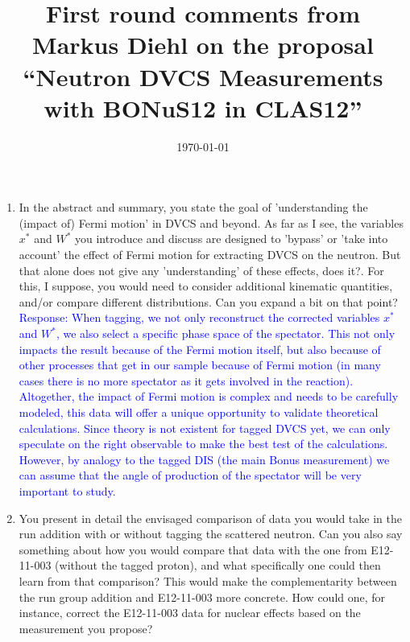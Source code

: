 \documentclass[a4paper,11pt,twoside]{article}
\title{First round comments from Markus Diehl on the proposal ``Neutron DVCS 
Measurements with BONuS12 in CLAS12''}
\date{\today}
\begin{document}
\maketitle


\begin{enumerate}
   
   \item In the abstract and summary, you state the goal of 'understanding the
(impact of) Fermi motion' in DVCS and beyond.  As far as I see, the variables
$x^*$ and $W^*$ you introduce and discuss are designed to 'bypass' or 'take
into account' the effect of Fermi motion for extracting DVCS on the neutron.
But that alone does not give any 'understanding' of these effects, does it?.
For this, I suppose, you would need to consider additional kinematic
quantities, and/or compare different distributions.  Can you expand a bit on
that point?\\

\textcolor{blue}{Response: When tagging, we not only reconstruct the corrected
variables $x^*$ and $W^*$, we also select a specific phase space of
the spectator. This not only impacts the result because of the Fermi
motion itself, but also because of other processes that get in our
sample because of Fermi motion (in many cases there is no more
spectator as it gets involved in the reaction). Altogether, the impact
of Fermi motion is complex and needs to be carefully modeled, this
data will offer a unique opportunity to validate theoretical
calculations. Since theory is not existent for tagged DVCS yet, we can
only speculate on the right observable to make the best test of the
calculations. However, by analogy to the tagged DIS (the main Bonus
measurement) we can assume that the angle of production of the
      spectator will be very important to study.}\\

\item You present in detail the envisaged comparison of data you would take in
the run addition with or without tagging the scattered neutron.  Can you also
say something about how you would compare that data with the one from
E12-11-003 (without the tagged proton), and what specifically one could then
learn from that comparison?  This would make the complementarity between the
run group addition and E12-11-003 more concrete.  How could one, for instance,
correct the E12-11-003 data for nuclear effects based on the measurement you
propose?\\


\end{enumerate}
\end{document}
